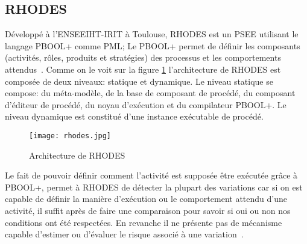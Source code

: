 \subsection*{RHODES}
Développé à l'ENSEEIHT-IRIT à Toulouse, RHODES est un PSEE utilisant le langage PBOOL+ comme PML; Le PBOOL+ permet de définir les composants (activités, rôles, produits et stratégies) des processus et les comportements attendus~\cite{si}. 
Comme on le voit sur la figure \ref{rhodesArch} l'architecture de RHODES est composée de deux niveaux: statique et dynamique. Le niveau statique se compose: du méta-modèle, de la base de composant de procédé, du composant d'éditeur de procédé, du noyau d'exécution et du compilateur PBOOL+. Le niveau dynamique est constitué d'une instance exécutable de procédé.
\begin{figure}[h]
\centering
\texttt{[image: rhodes.jpg]}
\caption{\label{rhodesArch}Architecture de RHODES~\cite{si}}
\end{figure}
Le fait de pouvoir définir comment l'activité est supposée être exécutée grâce à PBOOL+, permet à RHODES de détecter la plupart des variations car si on est capable de définir la manière d'exécution ou le comportement attendu d'une activité, il suffit après de faire une comparaison pour savoir si oui ou non nos conditions ont été respectées. En revanche il ne présente pas de mécanisme capable d'estimer ou d'évaluer le risque associé à une variation~\cite{almRhodes}.

